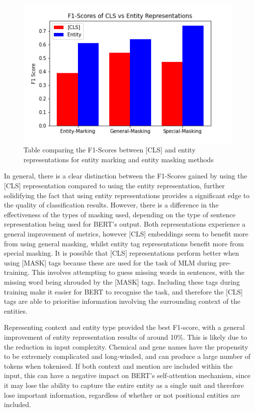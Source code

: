 \documentclass{l4proj}
\begin{document}
\begin{figure}[htb]
    \centering
    \includegraphics[width=12cm]{images/F1.png}
  \caption{Table comparing the F1-Scores between [CLS] and entity representations for entity marking and entity masking methods}
  \label{fig:F1}
\end{figure}

\newpage
In general, there is a clear distinction between the F1-Scores gained by using the [CLS] representation compared to using the entity representation, further solidifying the fact that using entity representations provides a significant edge to the quality of classification results. However, there is a difference in the effectiveness of the types of masking used, depending on the type of sentence representation being used for BERT's output. Both representations experience a general improvement of metrics, however [CLS] embeddings seem to benefit more from using general masking, whilst entity tag representations benefit more from special masking. It is possible that [CLS] representations perform better when using [MASK] tags because these are used for the task of MLM during pre-training. This involves attempting to guess missing words in sentences, with the missing word being shrouded by the [MASK] tags. Including these tags during training make it easier for BERT to recognise the task, and therefore the [CLS] tags are able to prioritise information involving the surrounding context of the entities.

Representing context and entity type provided the best F1-score, with a general improvement of entity representation results of around 10\%. This is likely due to the reduction in input complexity. Chemical and gene names have the propensity to be extremely complicated and long-winded, and can produce a large number of tokens when tokenised. If both context and mention are included within the input, this can have a negative impact on BERT's self-attention mechanism, since it may lose the ability to capture the entire entity as a single unit and therefore lose important information, regardless of whether or not positional entities are included. 
\end{document}
